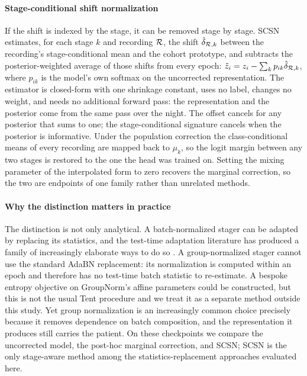\paragraph{Stage-conditional shift normalization}
If the shift is indexed by the stage, it can be removed stage by stage. SCSN
estimates, for each stage $k$ and recording $\mathcal{R}$, the shift
$\hat\delta_{\mathcal{R},k}$ between the recording's stage-conditional mean and the
cohort prototype, and subtracts the posterior-weighted average of those shifts
from every epoch:
$\tilde z_i=z_i-\sum_k p_{ik}\hat\delta_{\mathcal{R},k}$, where $p_{ik}$ is the
model's own softmax on the uncorrected representation. The estimator is
closed-form with one shrinkage constant, uses no label, changes no weight, and
needs no additional forward pass: the representation and the posterior come
from the same pass over the night. The offset cancels for any
posterior that sums to one; the stage-conditional signature cancels when the
posterior is informative. Under the population correction the class-conditional
means of every recording are mapped back to $\mu_k$, so the logit margin
between any two stages is restored to the one the head was trained on.
Setting the mixing parameter of the interpolated form to zero recovers the
marginal correction, so the two are endpoints of one family rather than
unrelated methods.

\paragraph{Why the distinction matters in practice}
The distinction is not only analytical. A batch-normalized stager can be
adapted by replacing its statistics, and the test-time adaptation literature
has produced a family of increasingly elaborate ways to do so
\citep{li2018adabn,wang2021tent,cafa2023,unmixtns2024,psdnorm2026}. A
group-normalized stager cannot use the standard AdaBN replacement: its
normalization is computed within an epoch and therefore has no test-time batch
statistic to re-estimate. A bespoke entropy objective on GroupNorm's affine
parameters could be constructed, but this is not the usual Tent procedure and
we treat it as a separate method outside this study. Yet group normalization
is an increasingly common choice precisely because it removes dependence on
batch composition, and the representation it produces still carries the
patient. On these checkpoints we compare the uncorrected model, the post-hoc
marginal correction, and SCSN; SCSN is the only stage-aware method among the
statistics-replacement approaches evaluated here.

